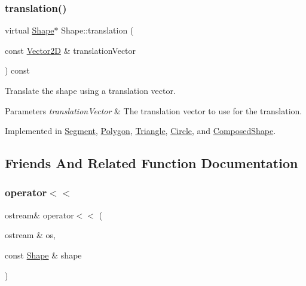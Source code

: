\subsubsection{\texorpdfstring{translation()}{translation()}}
{\footnotesize\ttfamily virtual \hyperlink{class_shape}{Shape}$\ast$ Shape\+::translation (\begin{DoxyParamCaption}\item[{const \hyperlink{class_vector2_d}{Vector2D} \&}]{translation\+Vector }\end{DoxyParamCaption}) const\hspace{0.3cm}{\ttfamily [pure virtual]}}

Translate the shape using a translation vector. 
\begin{DoxyParams}{Parameters}
{\em translation\+Vector} & The translation vector to use for the translation. \\
\hline
\end{DoxyParams}


Implemented in \hyperlink{class_segment_a8592ee9b864b2ebc61ab1810fa7dc577}{Segment}, \hyperlink{class_polygon_ae828addfa5cffab547bcb16db1f275be}{Polygon}, \hyperlink{class_triangle_ac66208b0b633add41b915860f051cf44}{Triangle}, \hyperlink{class_circle_ad3b54b369f44baa1947aa3991f55e068}{Circle}, and \hyperlink{class_composed_shape_a31337a3fc33ac1fb929edbb6ff485dcc}{Composed\+Shape}.



\subsection{Friends And Related Function Documentation}
\hypertarget{class_shape_ada7f3e97b3113c4725bf7ec7293b5a36}{}\label{class_shape_ada7f3e97b3113c4725bf7ec7293b5a36} 
\subsubsection{\texorpdfstring{operator$<$$<$}{operator<<}}
{\footnotesize\ttfamily ostream\& operator$<$$<$ (\begin{DoxyParamCaption}\item[{ostream \&}]{os,  }\item[{const \hyperlink{class_shape}{Shape} \&}]{shape }\end{DoxyParamCaption})\hspace{0.3cm}{\ttfamily [friend]}}



